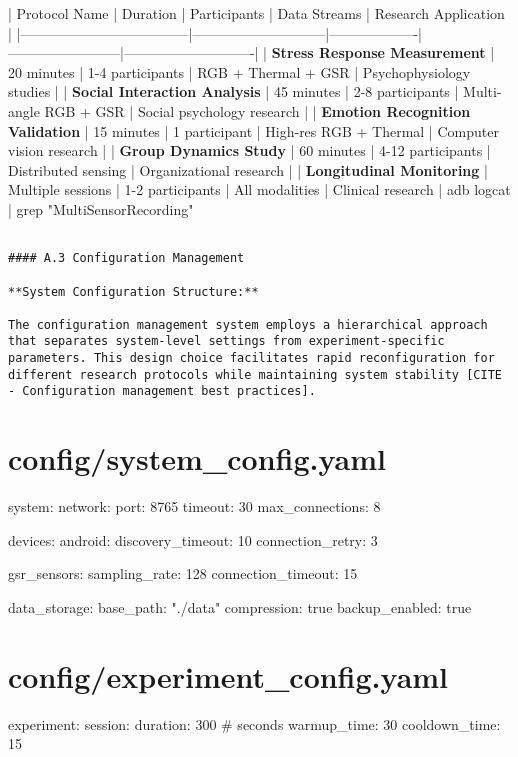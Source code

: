 \documentclass[11pt,a4paper]{report}
\begin{document}
| Protocol Name                      | Duration                    | Participants      | Data Streams           | Research Application       |
|------------------------------------|-----------------------------|-------------------|------------------------|----------------------------|
| \textbf{Stress Response Measurement}    | 20 minutes                  | 1-4 participants  | RGB + Thermal + GSR    | Psychophysiology studies   |
| \textbf{Social Interaction Analysis}    | 45 minutes                  | 2-8 participants  | Multi-angle RGB + GSR  | Social psychology research |
| \textbf{Emotion Recognition Validation} | 15 minutes                  | 1 participant     | High-res RGB + Thermal | Computer vision research   |
| \textbf{Group Dynamics Study}           | 60 minutes                  | 4-12 participants | Distributed sensing    | Organizational research    |
| \textbf{Longitudinal Monitoring}        | Multiple sessions           | 1-2 participants  | All modalities         | Clinical research          |
 adb logcat                         | grep "MultiSensorRecording"

\begin{verbatim}

#### A.3 Configuration Management

**System Configuration Structure:**

The configuration management system employs a hierarchical approach that separates system-level settings from experiment-specific parameters. This design choice facilitates rapid reconfiguration for different research protocols while maintaining system stability [CITE - Configuration management best practices].

\end{verbatim}
\section{config/system_config.yaml}
system:
  network:
    port: 8765
    timeout: 30
    max\_connections: 8

  devices:
    android:
      discovery\_timeout: 10
      connection\_retry: 3

    gsr\_sensors:
      sampling\_rate: 128
      connection\_timeout: 15

  data\_storage:
    base\_path: "./data"
    compression: true
    backup\_enabled: true

\section{config/experiment_config.yaml}
experiment:
  session:
    duration: 300  \# seconds
    warmup\_time: 30
    cooldown\_time: 15
\end{document}
